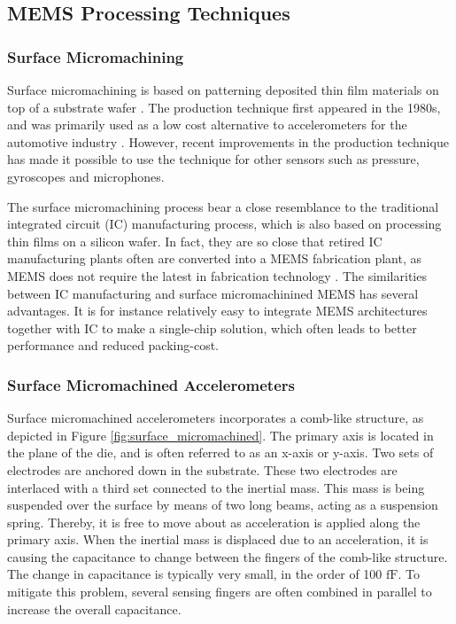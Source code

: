\subsection{MEMS Processing Techniques}

\subsubsection{Surface Micromachining}

Surface micromachining is based on patterning deposited thin film materials on top of a substrate wafer \cite[p.~5]{kaajakari09}. The production technique first appeared in the 1980s, and was primarily used as a low cost alternative to accelerometers for the automotive industry \cite[p.~101]{maluf04}. However, recent improvements in the production technique has made it possible to use the technique for other sensors such as pressure, gyroscopes and microphones. 

The surface micromachining process bear a close resemblance to the traditional integrated circuit (IC) manufacturing process, which is also based on processing thin films on a silicon wafer. In fact, they are so close that retired IC manufacturing plants often are converted into a MEMS fabrication plant, as MEMS does not require the latest in fabrication technology \cite[p.~4]{kaajakari09}. The similarities between IC manufacturing and surface micromachinined MEMS has several advantages. It is for instance relatively easy to integrate MEMS architectures together with IC to make a single-chip solution, which often leads to better performance and reduced packing-cost. 

\subsubsection{Surface Micromachined Accelerometers}

Surface micromachined accelerometers incorporates a comb-like structure, as depicted in Figure \ref{fig:surface_micromachined}. The primary axis is located in the plane of the die, and is often referred to as an x-axis or y-axis. Two sets of electrodes are anchored down in the substrate. These two electrodes are interlaced with a third set connected to the inertial mass. This mass is being suspended over the surface by means of two long beams, acting as a suspension spring. Thereby, it is free to move about as acceleration is applied along the primary axis. When the inertial mass is displaced due to an acceleration, it is causing the capacitance to change between the fingers of the comb-like structure. The change in capacitance is typically very small, in the order of 100 $\si{\femto\farad}$. To mitigate this problem, several sensing fingers are often combined in parallel to increase the overall capacitance.

